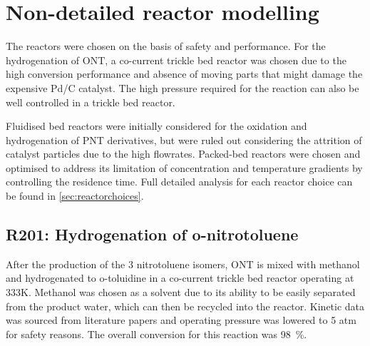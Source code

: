 \section{Non-detailed reactor modelling} \label{Non-detailed}

The reactors were chosen on the basis of safety and performance. For the hydrogenation of ONT, a co-current trickle bed reactor was chosen due to the high conversion performance and absence of moving parts that might damage the expensive Pd/C catalyst. The high pressure required for the reaction can also be well controlled in a trickle bed reactor. 

Fluidised bed reactors were initially considered for the oxidation and hydrogenation of PNT derivatives, but were ruled out considering the attrition of catalyst particles due to the high flowrates. Packed-bed reactors were chosen and optimised to address its limitation of concentration and temperature gradients by controlling the residence time. Full detailed analysis for each reactor choice can be found in \cref{sec:reactorchoices}.

\begin{table}[h]
\centering
\caption{Summary of non-detailed reactors}
\label{tab:nondetailedtable}
\end{table}

\subsection{R201: Hydrogenation of o-nitrotoluene}
After the production of the 3 nitrotoluene isomers, ONT is mixed with methanol and hydrogenated to o-toluidine in a co-current trickle bed reactor operating at 333K. Methanol was chosen as a solvent due to its ability to be easily separated from the product water, which can then be recycled into the reactor. Kinetic data was sourced from literature papers \cite{rajadhyaksha_solvent_1986} and operating pressure was lowered to 5 atm for safety reasons. The overall conversion for this reaction was \SI{98}{\%}.

